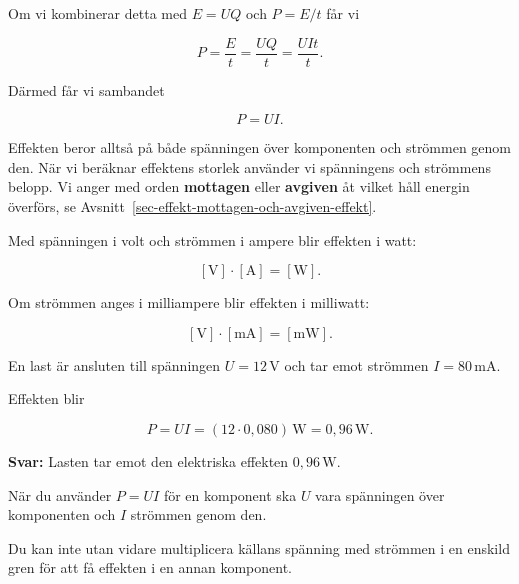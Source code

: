 \documentclass[
  swedish,
  11pt,
  a4paper,
  DIV=11,
  numbers=noendperiod,
  twoside,
  open=any]{scrreprt}
\begin{document}
Om vi kombinerar detta med \(E = UQ\) och \(P = E/t\) får vi

\[
P = \frac{E}{t}
= \frac{UQ}{t}
= \frac{UIt}{t}.
\]

Därmed får vi sambandet

\[
\boxed{P = UI}.
\]

Effekten beror alltså på både spänningen över komponenten och strömmen
genom den. När vi beräknar effektens storlek använder vi spänningens och
strömmens belopp. Vi anger med orden \textbf{mottagen} eller
\textbf{avgiven} åt vilket håll energin överförs, se
Avsnitt~\ref{sec-effekt-mottagen-och-avgiven-effekt}.

Med spänningen i volt och strömmen i ampere blir effekten i watt:

\[
[\mathrm{V}] \cdot [\mathrm{A}] = [\mathrm{W}].
\]

Om strömmen anges i milliampere blir effekten i milliwatt:

\[
[\mathrm{V}] \cdot [\mathrm{mA}] = [\mathrm{mW}].
\]

\begin{tcolorbox}[enhanced jigsaw, arc=.35mm, bottomrule=.15mm, bottomtitle=1mm, breakable, colback=white, colbacktitle=quarto-callout-note-color!10!white, colframe=quarto-callout-note-color-frame, coltitle=black, left=2mm, leftrule=.75mm, opacityback=0, opacitybacktitle=0.6, rightrule=.15mm, title={Exempel: effekt i en elektrisk last}, titlerule=0mm, toprule=.15mm, toptitle=1mm]

En last är ansluten till spänningen \(U = 12\,\mathrm{V}\) och tar emot
strömmen \(I = 80\,\mathrm{mA}\).

Effekten blir

\[
P = UI
= (12 \cdot 0{,}080)\,\mathrm{W}
= 0{,}96\,\mathrm{W}.
\]

\textbf{Svar:} Lasten tar emot den elektriska effekten
\(0{,}96\,\mathrm{W}\).

\end{tcolorbox}

\begin{tcolorbox}[enhanced jigsaw, arc=.35mm, bottomrule=.15mm, bottomtitle=1mm, breakable, colback=white, colbacktitle=quarto-callout-important-color!10!white, colframe=quarto-callout-important-color-frame, coltitle=black, left=2mm, leftrule=.75mm, opacityback=0, opacitybacktitle=0.6, rightrule=.15mm, title=\textcolor{quarto-callout-important-color}{\faExclamation}\hspace{0.5em}{Spänning och ström ska avse samma komponent}, titlerule=0mm, toprule=.15mm, toptitle=1mm]

När du använder \(P = UI\) för en komponent ska \(U\) vara spänningen
över komponenten och \(I\) strömmen genom den.

Du kan inte utan vidare multiplicera källans spänning med strömmen i en
enskild gren för att få effekten i en annan komponent.

\end{tcolorbox}
\end{document}

